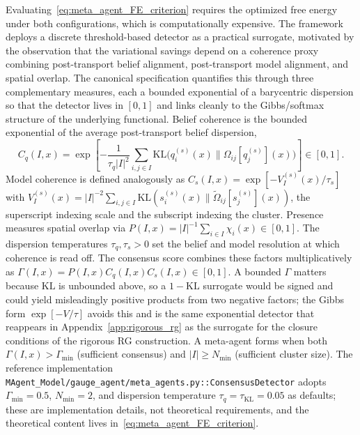 \documentclass[11pt]{article}
\begin{document}
Evaluating~\eqref{eq:meta_agent_FE_criterion} requires the optimized free energy under both configurations, which is computationally expensive. The framework deploys a discrete threshold-based detector as a practical surrogate, motivated by the observation that the variational savings depend on a coherence proxy combining post-transport belief alignment, post-transport model alignment, and spatial overlap. The canonical specification quantifies this through three complementary measures, each a bounded exponential of a barycentric dispersion so that the detector lives in $[0, 1]$ and links cleanly to the Gibbs/softmax structure of the underlying functional. Belief coherence is the bounded exponential of the average post-transport belief dispersion,
\begin{equation}
C_q(I, x) = \exp\left[-\frac{1}{\tau_q |I|^2}\sum_{i,j \in I} \mathrm{KL}\big(q_i^{(s)}(x) \| \Omega_{ij}[q_j^{(s)}](x)\big)\right] \in [0, 1].
\end{equation}
Model coherence is defined analogously as $C_s(I, x) = \exp[-V^{(s)}_I(x)/\tau_s]$ with $V^{(s)}_I(x) = |I|^{-2}\sum_{i,j \in I} \mathrm{KL}(s_i^{(s)}(x) \| \tilde{\Omega}_{ij}[s_j^{(s)}](x))$, the superscript indexing scale and the subscript indexing the cluster. Presence measures spatial overlap via $P(I, x) = |I|^{-1}\sum_{i \in I} \chi_i(x) \in [0, 1]$. The dispersion temperatures $\tau_q, \tau_s > 0$ set the belief and model resolution at which coherence is read off. The consensus score combines these factors multiplicatively as $\Gamma(I, x) = P(I, x) C_q(I, x) C_s(I, x) \in [0, 1]$. A bounded $\Gamma$ matters because $\mathrm{KL}$ is unbounded above, so a $1 - \mathrm{KL}$ surrogate would be signed and could yield misleadingly positive products from two negative factors; the Gibbs form $\exp[-V/\tau]$ avoids this and is the same exponential detector that reappears in Appendix~\ref{app:rigorous_rg} as the surrogate for the closure conditions of the rigorous RG construction. A meta-agent forms when both $\Gamma(I, x) > \Gamma_{\min}$ (sufficient consensus) and $|I| \geq N_{\min}$ (sufficient cluster size). The reference implementation \texttt{MAgent\_Model/gauge\_agent/meta\_agents.py::ConsensusDetector} adopts $\Gamma_{\min} = 0.5$, $N_{\min} = 2$, and dispersion temperature $\tau_q = \tau_{\mathrm{KL}} = 0.05$ as defaults; these are implementation details, not theoretical requirements, and the theoretical content lives in~\eqref{eq:meta_agent_FE_criterion}.
\end{document}
